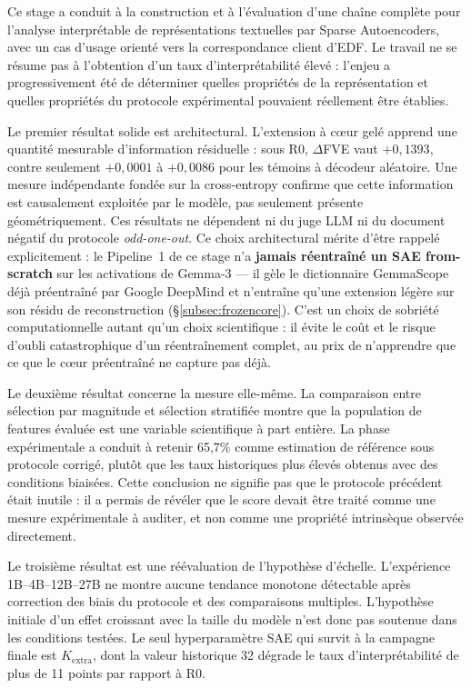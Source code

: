 \documentclass[11pt]{article}
\begin{document}
Ce stage a conduit à la construction et à l'évaluation d'une chaîne complète pour
l'analyse interprétable de représentations textuelles par Sparse Autoencoders, avec
un cas d'usage orienté vers la correspondance client d'EDF. Le travail ne se résume
pas à l'obtention d'un taux d'interprétabilité élevé : l'enjeu a progressivement été
de déterminer quelles propriétés de la représentation et quelles propriétés du
protocole expérimental pouvaient réellement être établies.

Le premier résultat solide est architectural. L'extension à cœur gelé apprend une
quantité mesurable d'information résiduelle : sous R0, $\Delta$FVE vaut $+0{,}1393$,
contre seulement $+0{,}0001$ à $+0{,}0086$ pour les témoins à décodeur aléatoire. Une
mesure indépendante fondée sur la cross-entropy confirme que cette information est
causalement exploitée par le modèle, pas seulement présente géométriquement.
Ces résultats ne dépendent ni du juge LLM ni du document négatif du protocole
\emph{odd-one-out}. Ce choix architectural mérite d'être rappelé explicitement :
le Pipeline~1 de ce stage n'a \textbf{jamais réentraîné un SAE from-scratch} sur
les activations de Gemma-3 --- il gèle le dictionnaire GemmaScope déjà
préentraîné par Google DeepMind et n'entraîne qu'une extension légère sur son
résidu de reconstruction (\S\ref{subsec:frozencore}). C'est un choix de
sobriété computationnelle autant qu'un choix scientifique : il évite le coût
et le risque d'oubli catastrophique d'un réentraînement complet, au prix de
n'apprendre que ce que le cœur préentraîné ne capture pas déjà.

Le deuxième résultat concerne la mesure elle-même. La comparaison entre sélection par
magnitude et sélection stratifiée montre que la population de features évaluée est
une variable scientifique à part entière. La phase expérimentale a conduit à retenir 65,7\% comme
estimation de référence sous protocole corrigé, plutôt que les taux historiques plus
élevés obtenus avec des conditions biaisées. Cette conclusion ne signifie pas que le
protocole précédent était inutile : il a permis de révéler que le score devait être
traité comme une mesure expérimentale à auditer, et non comme une propriété intrinsèque
observée directement.

Le troisième résultat est une réévaluation de l'hypothèse d'échelle. L'expérience
1B--4B--12B--27B ne montre aucune tendance monotone détectable après correction des
biais du protocole et des comparaisons multiples. L'hypothèse initiale d'un effet
croissant avec la taille du modèle n'est donc pas soutenue dans les conditions testées.
Le seul hyperparamètre SAE qui survit à la campagne finale est $K_\text{extra}$, dont
la valeur historique 32 dégrade le taux d'interprétabilité de plus de 11 points par
rapport à R0.
\end{document}
